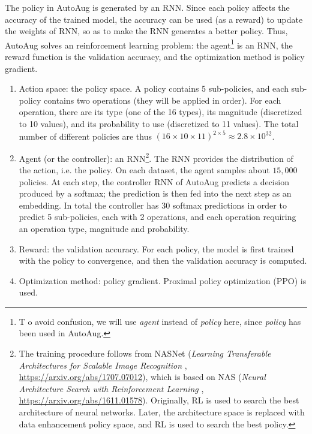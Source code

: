 The policy in AutoAug is generated by an RNN. Since each policy affects the accuracy of the trained model, the accuracy can be used (as a reward) to update the weights of RNN, so as to make the RNN generates a better policy. Thus, AutoAug solves an reinforcement learning problem: the agent\footnote{T o avoid confusion, we will use \emph{agent} instead of \emph{policy} here, since \emph{policy} has been used in AutoAug.}  is an RNN, the reward function is the validation accuracy, and the optimization method is policy gradient.

\begin{enumerate}
    \item Action space: the policy space. A policy contains 5 sub-policies, and each sub-policy contains two operations (they will be applied in order). For each operation, there are its type (one of the 16 types), its magnitude (discretized to 10 values), and its probability to use (discretized to 11 values). The total number of different policies are thus $(16\times10\times11)^{2\times5}\approx2.8\times10^{32}$.
    \item Agent (or the controller): an RNN\footnote{The training procedure follows from NASNet (\emph{Learning Transferable Architectures for Scalable Image Recognition }, \url{https://arxiv.org/abs/1707.07012}), which is based on NAS (\emph{Neural Architecture Search with Reinforcement Learning }, \url{https://arxiv.org/abs/1611.01578}). Originally, RL is used to search the best architecture of neural networks. Later, the architecture space is replaced with data enhancement policy space, and RL is used to search the best policy.}. The RNN provides the distribution of the action, i.e. the policy. On each dataset, the agent samples about $15,000$ policies. At each step, the controller RNN of AutoAug predicts a decision produced by a softmax; the prediction is then fed into the next step as an embedding. In total the controller has 30 softmax predictions in order to predict 5 sub-policies, each with 2 operations, and each operation requiring an operation type, magnitude and probability.
    \item Reward: the validation accuracy. For each policy, the model is first trained with the policy to convergence, and then the validation accuracy is computed.
    \item Optimization method: policy gradient. Proximal policy optimization (PPO) is used.
\end{enumerate}

 

